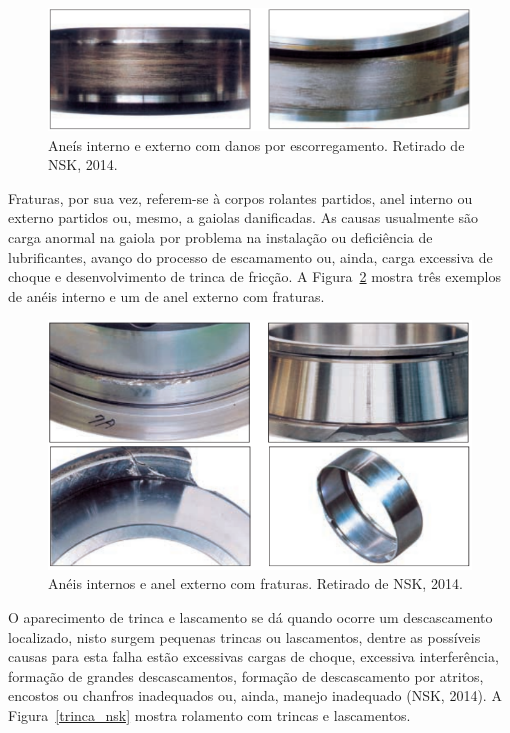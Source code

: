 \documentclass[
	12pt,				
	oneside,			
	a4paper,			
	english,			
	brazil,			
	]{abntex2ppgsi}
\begin{document}
\begin{figure}[H]
\centering
\includegraphics[width=\textwidth,height=\textheight,keepaspectratio]{escorregamento_nsk}
\caption {Aneís interno e externo com danos por escorregamento. Retirado de NSK, 2014.}
\label{escorregamento_nsk}
\end{figure}

Fraturas, por sua vez, referem-se à corpos rolantes partidos, anel interno ou externo partidos ou, mesmo, a gaiolas danificadas. As causas usualmente são carga anormal na gaiola por problema na instalação ou deficiência de lubrificantes, avanço do processo de escamamento ou, ainda, carga excessiva de choque e desenvolvimento de trinca de fricção. A Figura~\ref{fraturas_nsk} mostra três exemplos de anéis interno e um de anel externo com fraturas. 

\begin{figure}[H]
\centering
\includegraphics[width=\textwidth,height=\textheight,keepaspectratio]{fraturas_nsk}
\caption {Anéis internos e anel externo com fraturas. Retirado de NSK, 2014.}
\label{fraturas_nsk}
\end{figure}

O aparecimento de trinca e lascamento se dá quando ocorre um descascamento localizado, nisto surgem pequenas trincas ou lascamentos, dentre as possíveis causas para esta falha estão excessivas cargas de choque, excessiva interferência, formação de grandes descascamentos, formação de descascamento por atritos, encostos ou chanfros inadequados ou, ainda, manejo inadequado (NSK, 2014). A Figura~\ref{trinca_nsk} mostra rolamento com trincas e lascamentos. 
\end{document}
